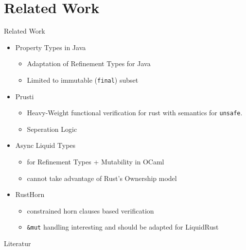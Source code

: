 \documentclass{sdqbeamer}
\begin{document}
\section{Related Work}

\begin{frame}{Related Work}
  \begin{itemize}
    \item Property Types in Java\cite{lanzinger_property_2021}
      \begin{itemize}
        \item Adaptation of Refinement Types for Java
        \item Limited to immutable (\texttt{final}) subset
      \end{itemize}
    \item Prusti\cite{astrauskas_leveraging_2019}
      \begin{itemize} 
        \item Heavy-Weight functional verification for rust with semantics for \texttt{unsafe}.
        \item Seperation Logic
      \end{itemize}
    \item Async Liquid Types\cite{kloos_asynchronous_2015}
      \begin{itemize} 
        \item for Refinement Types + Mutability in OCaml
        \item cannot take advantage of Rust's Ownership model
      \end{itemize}
    \item RustHorn\cite{matsushita_rusthorn_2020}
      \begin{itemize} 
        \item constrained horn clauses based verification
        \item \texttt{\&mut} handling interesting and should be adapted for LiquidRust
      \end{itemize}
  \end{itemize}
\end{frame}


\appendix
\beginbackup



\begin{frame}{Literatur}

  \printbibliography
\end{frame}
\end{document}
